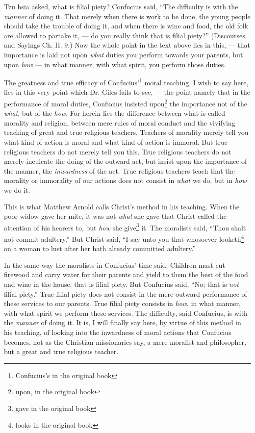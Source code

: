 Tzu hsia asked, what is filial piety?
Confucius said, ``The difficulty is with the \emph{manner}\cite{num25} of doing it. That merely when there is work to be done, the young people should take the trouble of doing it, and when there is wine and food, the old folk are allowed to partake it, --- do you really think that is filial piety?'' (Discourses and Sayings Ch. II. 9.)
Now the whole point in the text above lies in this, --- that importance is laid not upon \emph{what} duties you perform towards your parents, but upon \emph{how} --- in what manner, with what spirit, you perform those duties.

The greatness and true efficacy of Confucius'\footnote{Confucius's in the original book} moral teaching, I wish to say here, lies in this very point which Dr. Giles fails to see, --- the point namely that in the performance of moral duties, Confucius insisted upon\footnote{upon, in the original book} the importance not of the \emph{what}, but of the \emph{how}.
For herein lies the difference between what is called morality and religion, between mere rules of moral conduct and the vivifying teaching of great and true religious teachers.
Teachers of morality merely tell you what kind of action is moral and what kind of action is immoral.
But true religious teachers do not merely tell you this.
True religious teachers do not merely inculcate the doing of the outward act, but insist upon the importance of the manner, the \emph{inwardness} of the act.
True religious teachers teach that the morality or immorality of our actions does not consist in \emph{what} we do, but in \emph{how} we do it.

This is what Matthew Arnold calls Christ's method in his teaching.
When the poor widow gave her mite, it was not \emph{what} she gave that Christ called the attention of his hearers to, but \emph{how} she give\footnote{gave in the original book} it.
The moralists said, ``Thou shalt not commit adultery.''
But Christ said, ``I say unto you that whosoever looketh\footnote{looks in the original book} on a woman to lust after her hath already committed adultery.''

In the same way the moralists in Confucius' time said: Children must cut firewood and carry water for their parents and yield to them the best of the food and wine in the house: that is filial piety.
But Confucius said, ``No; that is \emph{not} filial piety.''
True filial piety does not consist in the mere outward performance of these services to our parents.
True filial piety consists in \emph{how}, in what manner, with what spirit we perform these services.
The difficulty, said Confucius, is with the \emph{manner} of doing it.
It is, I will finally say here, by virtue of this method in his teaching, of looking into the inwardness of moral actions that Confucius becomes, not as the Christian missionaries say, a mere moralist and philosopher, but a great and true religious teacher.

